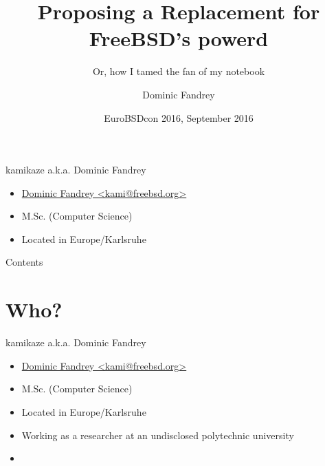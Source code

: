 \documentclass[aspectratio=169]{beamer}
\title{Proposing a Replacement for FreeBSD's powerd}
\subtitle{Or, how I tamed the fan of my notebook}
\author[D. Fandrey]{Dominic Fandrey}
\date[EuroBSDcon 2016]{EuroBSDcon 2016, September 2016}
\begin{document}
\begin{frame}[plain]
\titlepage
\end{frame}

\begin{frame}{kamikaze a.k.a. Dominic Fandrey}
\begin{itemize}
\item \href{mailto:kami@freebsd.org}{Dominic Fandrey <kami@freebsd.org>}
\item M.Sc. (Computer Science)
\item Located in Europe/Karlsruhe
\end{itemize}
\end{frame}

\begin{frame}{Contents}
\tableofcontents
\end{frame}

\section{Who?}

\begin{frame}{kamikaze a.k.a. Dominic Fandrey}
\begin{itemize}
\item<1-> \href{mailto:kami@freebsd.org}{Dominic Fandrey <kami@freebsd.org>}
\item<1-> M.Sc. (Computer Science)
\item<2-> Located in Europe/Karlsruhe
\item<3-> Working as a researcher at an undisclosed polytechnic university
\item<3-> 
\end{itemize}
\end{frame}
\end{document}
